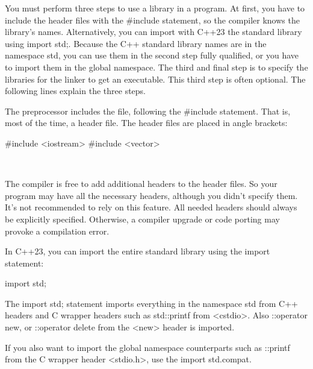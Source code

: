You must perform three steps to use a library in a program. At first, you have to include the header files with the \#include statement, so the compiler knows the library’s names. Alternatively, you can import with C++23 the standard library using import std;. Because the C++ standard library names are in the namespace std, you can use them in the second step fully qualified, or you have to import them in the global namespace. The third and final step is to specify the libraries for the linker to get an executable. This third step is often optional. The following lines explain the three steps.


The preprocessor includes the file, following the \#include statement. That is, most of the time, a header file. The header files are placed in angle brackets:

\begin{cpp}
#include <iostream>
#include <vector>
\end{cpp}

\hspace*{\fill} \\ %
\begin{tcolorbox}[breakable,enhanced jigsaw,colback=red!5!white,colframe=red!75!black,title={Specify all necessary header files}]

The compiler is free to add additional headers to the header files. So your program may have all the necessary headers, although you didn’t specify them. It’s not recommended to rely on this feature. All needed headers should always be explicitly specified. Otherwise, a compiler upgrade or code porting may provoke a compilation error.

\end{tcolorbox}


In C++23, you can import the entire standard library using the import statement:

\begin{cpp}
import std;
\end{cpp}

The import std; statement imports everything in the namespace std from C++ headers and C wrapper headers such as std::printf from <cstdio>. Also ::operator new, or ::operator delete from the <new> header is imported.

If you also want to import the global namespace counterparts such as ::printf from the C wrapper header <stdio.h>, use the import std.compat.

